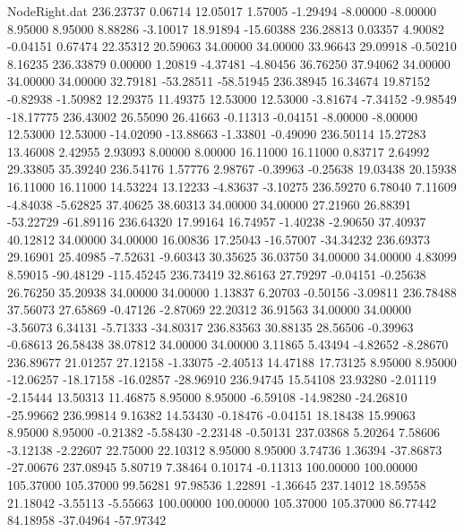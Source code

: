 \begin{filecontents}{NodeRight.dat}
 236.23737    0.06714   12.05017     1.57005   -1.29494   -8.00000   -8.00000    8.95000    8.95000    8.88286   -3.10017   18.91894  -15.60388
 236.28813    0.03357    4.90082    -0.04151    0.67474   22.35312   20.59063   34.00000   34.00000   33.96643   29.09918   -0.50210    8.16235
 236.33879    0.00000    1.20819    -4.37481   -4.80456   36.76250   37.94062   34.00000   34.00000   34.00000   32.79181  -53.28511  -58.51945
 236.38945   16.34674   19.87152    -0.82938   -1.50982   12.29375   11.49375   12.53000   12.53000   -3.81674   -7.34152   -9.98549  -18.17775
 236.43002   26.55090   26.41663    -0.11313   -0.04151   -8.00000   -8.00000   12.53000   12.53000  -14.02090  -13.88663   -1.33801   -0.49090
 236.50114   15.27283   13.46008     2.42955    2.93093    8.00000    8.00000   16.11000   16.11000    0.83717    2.64992   29.33805   35.39240
 236.54176    1.57776    2.98767    -0.39963   -0.25638   19.03438   20.15938   16.11000   16.11000   14.53224   13.12233   -4.83637   -3.10275
 236.59270    6.78040    7.11609    -4.84038   -5.62825   37.40625   38.60313   34.00000   34.00000   27.21960   26.88391  -53.22729  -61.89116
 236.64320   17.99164   16.74957    -1.40238   -2.90650   37.40937   40.12812   34.00000   34.00000   16.00836   17.25043  -16.57007  -34.34232
 236.69373   29.16901   25.40985    -7.52631   -9.60343   30.35625   36.03750   34.00000   34.00000    4.83099    8.59015  -90.48129 -115.45245
 236.73419   32.86163   27.79297    -0.04151   -0.25638   26.76250   35.20938   34.00000   34.00000    1.13837    6.20703   -0.50156   -3.09811
 236.78488   37.56073   27.65869    -0.47126   -2.87069   22.20312   36.91563   34.00000   34.00000   -3.56073    6.34131   -5.71333  -34.80317
 236.83563   30.88135   28.56506    -0.39963   -0.68613   26.58438   38.07812   34.00000   34.00000    3.11865    5.43494   -4.82652   -8.28670
 236.89677   21.01257   27.12158    -1.33075   -2.40513   14.47188   17.73125    8.95000    8.95000  -12.06257  -18.17158  -16.02857  -28.96910
 236.94745   15.54108   23.93280    -2.01119   -2.15444   13.50313   11.46875    8.95000    8.95000   -6.59108  -14.98280  -24.26810  -25.99662
 236.99814    9.16382   14.53430    -0.18476   -0.04151   18.18438   15.99063    8.95000    8.95000   -0.21382   -5.58430   -2.23148   -0.50131
 237.03868    5.20264    7.58606    -3.12138   -2.22607   22.75000   22.10312    8.95000    8.95000    3.74736    1.36394  -37.86873  -27.00676
 237.08945    5.80719    7.38464     0.10174   -0.11313  100.00000  100.00000  105.37000  105.37000   99.56281   97.98536    1.22891   -1.36645
 237.14012   18.59558   21.18042    -3.55113   -5.55663  100.00000  100.00000  105.37000  105.37000   86.77442   84.18958  -37.04964  -57.97342

\end{filecontents}
